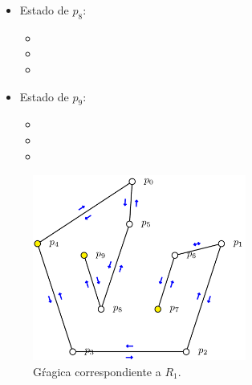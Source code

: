 \begin{multicols}{2}
\begin{itemize}
\begin{itemize}
      \item {}
      
      \item {}
      \end{itemize}

\item Estado de $p_8$:
      \begin{itemize}
      \item {}
      
      \item {}
      
      \item {}
      \end{itemize}

\item Estado de $p_9$:
      \begin{itemize}
      \item {}
      
      \item {}
      
      \item {}
      \end{itemize}

\end{itemize}
\end{multicols} 

\begin{figure}[ht]
        \begin{center}
                \includegraphics[width=7cm]{R1.png}
                \caption{Gŕagica correspondiente a $R_1$.}
        \end{center}
\end{figure}

